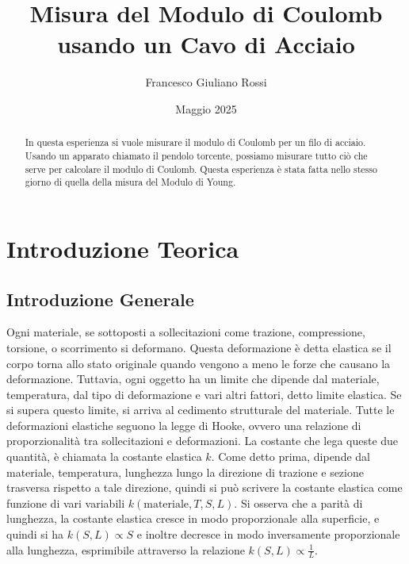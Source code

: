 \documentclass[a4paper]{article}
\title{Misura del Modulo di Coulomb usando un Cavo di Acciaio}
\author{Francesco Giuliano Rossi}
\date{Maggio 2025}
\begin{document}
\maketitle
\tableofcontents

\begin{abstract}
In questa esperienza si vuole misurare il modulo di Coulomb per un filo di acciaio. Usando un apparato chiamato il pendolo torcente, possiamo misurare tutto ciò che serve per calcolare il modulo di Coulomb. Questa esperienza è stata fatta nello stesso giorno di quella della misura del Modulo di Young. 
\end{abstract}

\section{Introduzione Teorica}
\subsection{Introduzione Generale}
Ogni materiale, se sottoposti a sollecitazioni come trazione, compressione, torsione, o scorrimento si deformano. Questa deformazione è detta elastica se il corpo torna allo stato originale quando vengono a meno le forze che causano la deformazione. Tuttavia, ogni oggetto ha un limite che dipende dal materiale, temperatura, dal tipo di deformazione e vari altri fattori, detto limite elastica. Se si supera questo limite, si arriva al cedimento strutturale del materiale. Tutte le deformazioni elastiche seguono la legge di Hooke, ovvero una relazione di proporzionalità tra sollecitazioni e deformazioni. La costante che lega queste due quantità, è chiamata la costante elastica $k$. Come detto prima, dipende dal materiale, temperatura, lunghezza lungo la direzione di trazione e sezione trasversa rispetto a tale direzione, quindi si può scrivere la costante elastica come funzione di vari variabili $k(\text{materiale},T,S,L)$. Si osserva che a parità di lunghezza, la costante elastica cresce in modo proporzionale alla superficie, e quindi si ha $k(S,L)\propto S$ e inoltre decresce in modo inversamente proporzionale alla lunghezza, esprimibile attraverso la relazione $k(S,L)\propto \frac{1}{L}$. 
\end{document}

